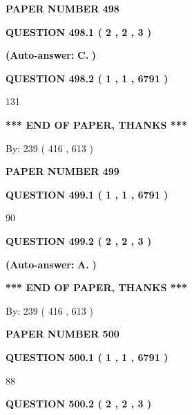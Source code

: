 \documentclass[12pt]{article}
\begin{document}
   
\newpage 
\setcounter{page}{ 
   498001 } 
   
   
 {\textbf{ \Large{ PAPER NUMBER  498  }}}
   
   
   
   
  
  
{\textbf{\large{QUESTION
498.1 
 ( 2 , 2 , 3 )
}}}
 
 
{\textbf{(Auto-answer:}}
{\textbf{\large{
C.}}}
{\textbf{)}}
 
 
  
  
{\textbf{\large{QUESTION
498.2 
 ( 1 , 1 , 6791 )
}}}

131
   
   
   
   
\vspace{1.0in} 
{\textbf{\large{ *** END OF PAPER, THANKS *** }}} 
   
   
\hspace{1.0in} By: 
 239 ( 416 ,  613 )
   
   
   
   
\newpage 
\setcounter{page}{ 
   499001 } 
   
   
 {\textbf{ \Large{ PAPER NUMBER  499  }}}
   
   
   
   
  
  
{\textbf{\large{QUESTION
499.1 
 ( 1 , 1 , 6791 )
}}}

90
  
  
{\textbf{\large{QUESTION
499.2 
 ( 2 , 2 , 3 )
}}}
 
 
{\textbf{(Auto-answer:}}
{\textbf{\large{
A.}}}
{\textbf{)}}
 
 
   
   
   
   
\vspace{1.0in} 
{\textbf{\large{ *** END OF PAPER, THANKS *** }}} 
   
   
\hspace{1.0in} By: 
 239 ( 416 ,  613 )
   
   
   
   
\newpage 
\setcounter{page}{ 
   500001 } 
   
   
 {\textbf{ \Large{ PAPER NUMBER  500  }}}
   
   
   
   
  
  
{\textbf{\large{QUESTION
500.1 
 ( 1 , 1 , 6791 )
}}}

88
  
  
{\textbf{\large{QUESTION
500.2 
 ( 2 , 2 , 3 )
}}}
 
\end{document}
